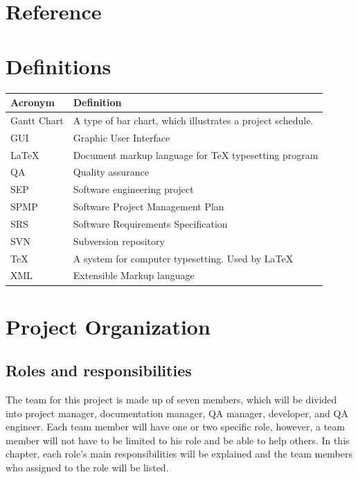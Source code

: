 \documentclass[11pt, a4paper]{report}
\begin{document}
\pagebreak


\chapter{Reference}

\pagebreak


\chapter{Definitions}
\begin{tabular}{| l | l | }
\hline
Acronym      		&	Definition       									\\ \hline
Gantt Chart      	& 	A type of bar chart, which illustrates a project schedule.		\\ \hline
GUI				& 	Graphic User Interface 								\\ \hline
{\LaTeX}			&	Document markup language for {\TeX} typesetting program 		\\ \hline
QA 				&	Quality assurance 									\\ \hline
SEP				&	Software engineering project							\\ \hline
SPMP				&	Software Project Management Plan						\\ \hline
SRS				&	Software Requirements Specification						\\ \hline
SVN				&	Subversion repository									\\ \hline
{\TeX} 			&	A system for computer typesetting. Used by {\LaTeX}			\\ \hline
XML				& 	Extensible Markup language 							\\ \hline
\end{tabular}

\pagebreak


\chapter{Project Organization}

\section{Roles and responsibilities}
The team for this project is made up of seven members, which will be divided into project manager, documentation manager, QA manager, developer, and QA engineer. Each team member will have one or two specific role, however, a team member will not have to be limited to his role and be able to help others. In this chapter, each role's main responsibilities will be explained and the team members who assigned to the role will be listed.
\end{document}
